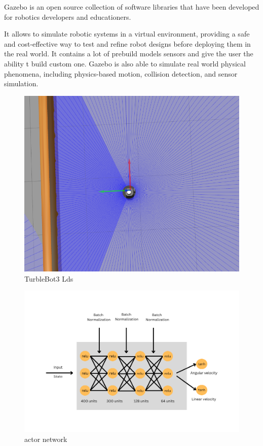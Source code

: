\documentclass[12pt]{extarticle}
\begin{document}
Gazebo is an open source collection of software libraries that have been developed for robotics developers and educationers.

It allows  to simulate  robotic systems in a virtual environment, providing a safe and cost-effective way to test and refine robot designs before deploying them in the real world. It contains a lot of prebuild models sensors and give the user the ability t build custom one. Gazebo is also able to simulate real world physical phenomena, including physics-based motion, collision detection, and sensor simulation.

  
 \begin{figure}[h]  
\centering
\includegraphics[scale=0.4]{lds.png}
\caption[Lds]{TurbleBot3 Lds}
\end{figure}






 
   




    
 \begin{figure}[h]  
\centering
\includegraphics[scale=0.65]{actor_net}
\caption[actor network]{actor network}
\end{figure}
\end{document}
